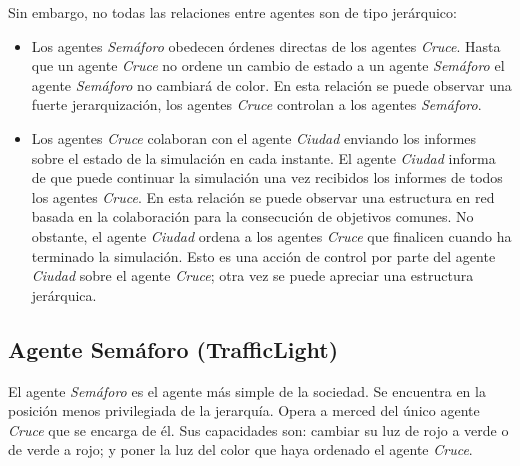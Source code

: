 Sin embargo, no todas las relaciones entre agentes son de tipo jerárquico:
\begin{itemize}
    \item Los agentes \textit{Semáforo} obedecen órdenes directas de los agentes \textit{Cruce}. Hasta que un agente \textit{Cruce} no ordene un cambio de estado a un agente \textit{Semáforo} el agente \textit{Semáforo} no cambiará de color. En esta relación se puede observar una fuerte jerarquización, los agentes \textit{Cruce} controlan a los agentes \textit{Semáforo}.
    \item Los agentes \textit{Cruce} colaboran con el agente \textit{Ciudad} enviando los informes sobre el estado de la simulación en cada instante. El agente \textit{Ciudad} informa de que puede continuar la simulación una vez recibidos los informes de todos los agentes \textit{Cruce}. En esta relación se puede observar una estructura en red basada en la colaboración para la consecución de objetivos comunes. No obstante, el agente \textit{Ciudad} ordena a los agentes \textit{Cruce} que finalicen cuando ha terminado la simulación. Esto es una acción de control por parte del agente \textit{Ciudad} sobre el agente \textit{Cruce}; otra vez se puede apreciar una estructura jerárquica.
\end{itemize}

\subsection{Agente Semáforo (TrafficLight)}
El agente \textit{Semáforo} es el agente más simple de la sociedad. Se encuentra en la posición menos privilegiada de la jerarquía. Opera a merced del único agente \textit{Cruce} que se encarga de él. Sus capacidades son: cambiar su luz de rojo a verde o de verde a rojo; y poner la luz del color que haya ordenado el agente \textit{Cruce}. 

